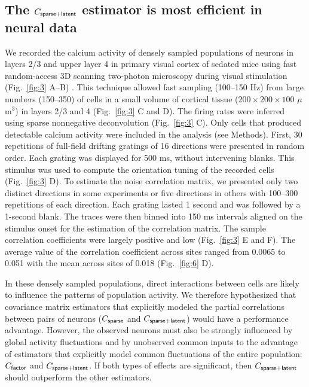 \subsection*{The $C_{\sf sparse+latent}$ estimator is most efficient in neural data}

We recorded the calcium activity of densely sampled populations of neurons in layers 2/3 and upper layer 4 in primary visual cortex of sedated mice using fast random-access 3D scanning two-photon microscopy during visual stimulation (Fig.~\ref{fig:3} A--B) \citep{Reddy:2005, Katona:2012, Cotton:2013}. This technique allowed fast sampling (100--150 Hz) from large numbers (150--350) of cells in a small volume of cortical tissue ($200\times200\times100$ $\mu$m$^3$) in layers 2/3 and 4 (Fig.~\ref{fig:3} C and D).  The firing rates were inferred using sparse nonnegative deconvolution \citep{Vogelstein:2010} (Fig.~\ref{fig:3} C). Only cells that produced detectable calcium activity were included in the analysis (see Methods).  First, 30 repetitions of full-field drifting gratings of 16 directions were presented in random order.  Each grating was displayed for 500 ms, without intervening blanks.  This stimulus was used to compute the orientation tuning of the recorded cells (Fig.~\ref{fig:3} D). To estimate the noise correlation matrix, we presented only two distinct directions in some experiments or five directions in others with 100--300 repetitions of each direction. Each grating lasted 1 second and was followed by a 1-second blank.  The traces were then binned into 150 ms intervals aligned on the stimulus onset for the estimation of the correlation matrix.   The sample correlation coefficients were largely positive and low (Fig.~\ref{fig:3} E and F). The average value of the correlation coefficient across sites ranged from 0.0065 to 0.051 with the mean across sites of 0.018 (Fig.~\ref{fig:6} D).

In these densely sampled populations, direct interactions between cells are likely to influence the patterns of population activity.  We therefore hypothesized that covariance matrix estimators that explicitly modeled the partial correlations between pairs of neurons ($C_{\sf sparse}$ and $C_{\sf sparse+latent}$) would have a performance advantage.  However, the observed neurons must also be strongly influenced by global activity fluctuations and by unobserved common inputs to the advantage of estimators that explicitly model common fluctuations of the entire population: $C_{\sf factor}$ and $C_{\sf sparse+latent}$.  If both types of effects are significant, then $C_{\sf sparse+latent}$ should outperform the other estimators.

